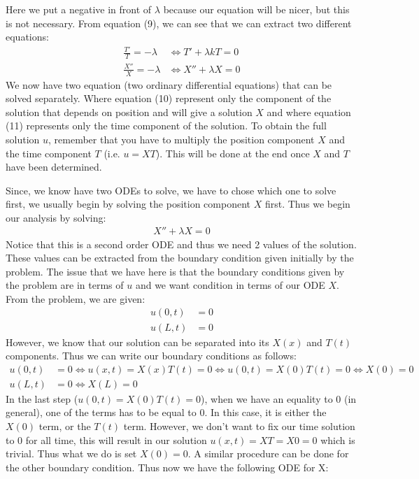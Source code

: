 \documentclass[11pt]{article}
\begin{document}
Here we put a negative in front of $\lambda$ because our equation will be nicer, but this is not necessary. From equation (9), we can see that we can extract two different equations:
\begin{align}
	\frac{T'}{T}=-\lambda &\Longleftrightarrow T'+\lambda kT=0 \\
	\frac{X''}{X}=-\lambda &\Longleftrightarrow X''+\lambda X=0
\end{align} 
We now have two equation (two ordinary differential equations) that can be solved separately. Where equation (10) represent only the component of the solution that depends on position and will give a solution $X$ and where equation (11) represents only the time component of the solution. To obtain the full solution $u$, remember that you have to multiply the position component $X$ and the time component $T$ (i.e. $u=XT$). This will be done at the end once $X$ and $T$ have been determined.

Since, we know have two ODEs to solve, we have to chose which one to solve first, we usually begin by solving the position component $X$ first. Thus we begin our analysis by solving:
\begin{align}
	 X''+\lambda X=0
\end{align}
Notice that this is a second order ODE and thus we need 2 values of the solution. These values can be extracted from the boundary condition given initially by the problem. The issue that we have here is that the boundary conditions given by the problem are in terms of $u$ and we want condition in terms of our ODE $X$. From the problem, we are given:
\begin{align}
	u(0,t)&=0 \\
	u(L,t)& =0
\end{align}
However, we know that our solution can be separated into its $X(x)$ and $T(t)$ components. Thus we can write our boundary conditions as follows:
\begin{align}
	u(0,t)&=0  \Longleftrightarrow u(x,t) = X(x)T(t)=0 \Longleftrightarrow u(0,t) = X(0)T(t)=0 \Longleftrightarrow X(0)=0\\
	u(L,t)& =0 \Longleftrightarrow X(L) = 0
\end{align}
In the last step ($u(0,t) = X(0)T(t)=0$), when we have an equality to 0 (in general), one of the terms has to be equal to 0. In this case, it is either the $X(0)$ term, or the $T(t)$ term. However, we don't want to fix our time solution to 0 for all time, this will result in our solution $u(x,t)=XT=X0=0$ which is trivial. Thus what we do is set $X(0)=0$. A similar procedure can be done for the other boundary condition. Thus now we have the following ODE for X:
\end{document}
